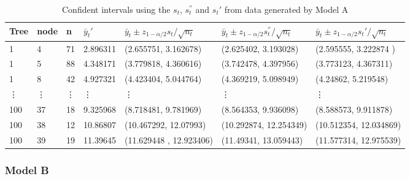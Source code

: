 \vspace{0.1in}

\begin{table}[H]
	\begin{tiny}
		\caption{Confident intervals using the $s_t$, $s^{''}_t$ and $s_t'$ from data generated by Model A  }
	\begin{tabular}{ |p{1cm}|p{1cm}|p{1cm}|p{1.7cm}|p{3cm}|p{3cm}|p{3cm}|}%
		\hline
		Tree    &node  &n   &$\bar{y}_{t}'$ &$\bar{y}_t \pm z_{1-\alpha/2} s_t /\sqrt{n_t}$&$\bar{y}_t \pm z_{1-\alpha/2} s^{''}_t /\sqrt{n_t}$ &$\bar{y}_t \pm z_{1-\alpha/2} s_t' /\sqrt{n_t}$\\
		\hline
		1&	4&	71&	2.896311&	(2.655751, 3.162678)&	(2.625402,	3.193028)&(2.595555,	3.222874
)\\
		1&	5&	88&	4.348171&	(3.779818,	4.360616)&	(3.742478,	4.397956)&	(3.773123,	4.367311)
\\
		1&	8&	42&	4.927321&	(4.423404,	5.044764)&	(4.369219,	5.098949)&	(4.24862,	5.219548)\\
		\vdots & \vdots & \vdots & \vdots & \vdots & \vdots  & \vdots\\%
		100&37&	18&	9.325968&(8.718481,	9.781969)&	(8.564353,	9.936098)&(8.588573,	9.911878)\\

		100&38&	12&	10.86807&(10.467292,	12.07993)&	(10.292874,	12.254349)& (10.512354,	12.034869)\\

		100&39&	19&	11.39645&(11.629448	,	12.923406)&(11.49341,	13.059443)&(11.577314,	12.975539)\\
		\hline
	\end{tabular}
	\label{est:A}
\end{tiny}
\end{table}

\subsubsection{Model B}

\vspace{0.1in}


